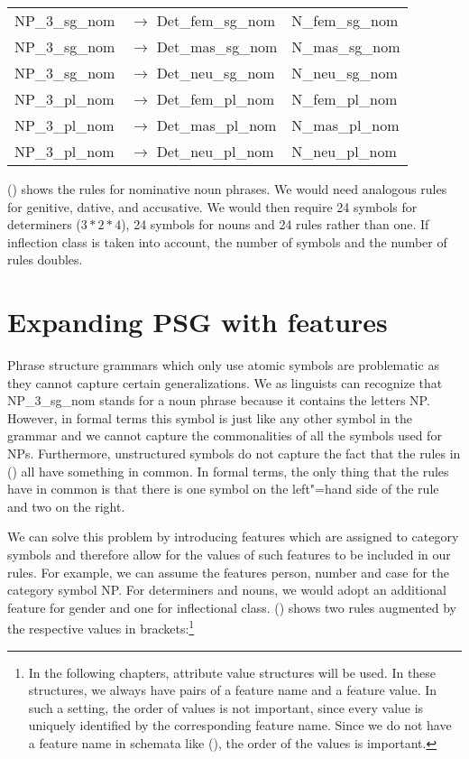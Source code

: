 \begin{tabular}[t]{@{}l@{ }l@{~~}l}
NP\_3\_sg\_nom  & $\to$ Det\_fem\_sg\_nom & N\_fem\_sg\_nom \\
NP\_3\_sg\_nom  & $\to$ Det\_mas\_sg\_nom & N\_mas\_sg\_nom \\
NP\_3\_sg\_nom  & $\to$ Det\_neu\_sg\_nom & N\_neu\_sg\_nom \\
NP\_3\_pl\_nom  & $\to$ Det\_fem\_pl\_nom & N\_fem\_pl\_nom \\
NP\_3\_pl\_nom  & $\to$ Det\_mas\_pl\_nom & N\_mas\_pl\_nom \\
NP\_3\_pl\_nom  & $\to$ Det\_neu\_pl\_nom & N\_neu\_pl\_nom \\[2mm]
\end{tabular}
\z
() shows the rules for nominative noun phrases. We would need analogous rules for genitive,
dative, and accusative. We would then require 24 symbols for determiners ($3*2*4$), 24 symbols for nouns and
24 rules rather than one. If inflection class is taken into account, the number of symbols and the
number of rules doubles. 

\section{Expanding PSG with features}
\label{sec-PSG-Merkmale}

Phrase structure grammars which only use atomic symbols are problematic as they cannot capture certain generalizations.
We as linguists can recognize that NP\_3\_sg\_nom stands for a noun phrase because it contains the letters NP. 
However, in formal terms this symbol is just like any other symbol in the grammar and we cannot capture the commonalities
of all the symbols used for NPs. Furthermore, unstructured symbols do not capture the fact that the rules in () 
all have something in common. In formal terms, the only thing that the rules have in common is that there is one symbol on the
left"=hand side of the rule and two on the right.

We can solve this problem by introducing features which are assigned to category symbols and therefore allow for the values of
such features to be included in our rules. For example, we can assume the features person, number and case for the category
symbol NP. For determiners and nouns, we would adopt an additional feature for gender and one for
inflectional class. () shows two rules augmented by the respective values in brackets:\footnote{%
  In the following chapters, attribute value structures will be used. In these structures, we always
have pairs of a feature name and a feature value. In such a setting, the order of values is not
important, since every value is uniquely identified by the corresponding feature name. Since we do not have a feature name
in schemata like (), the order of the values is important.
}

